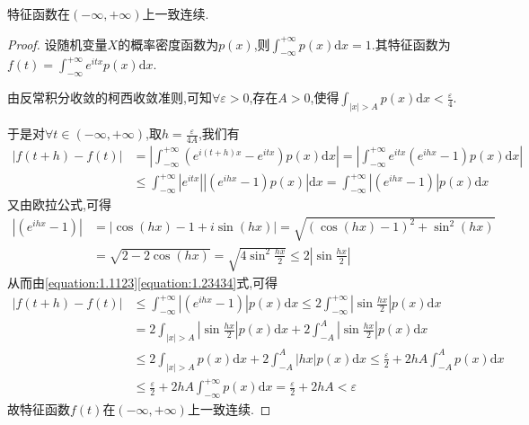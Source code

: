 \documentclass[lang=cn,newtx,10pt,sCheme=Chinese,citestyle=gb7714-2015, bibstyle=gb7714-2015]{../../Template/elegantbook}
\begin{document}
\begin{theorem}[特征函数性质]\label{theorem:特征函数性质}
特征函数在$(-\infty,+\infty)$上一致连续.
\end{theorem}
\begin{proof}

设随机变量\(X\)的概率密度函数为\(p(x)\),则\(\int_{-\infty}^{+\infty}p(x)\mathrm{d}x = 1\).其特征函数为\(f(t) = \int_{-\infty}^{+\infty}e^{itx}p(x)\mathrm{d}x\).

由反常积分收敛的柯西收敛准则,可知\(\forall \varepsilon > 0\),存在\(A > 0\),使得\(\int_{|x| > A}p(x)\mathrm{d}x < \frac{\varepsilon}{4}\).

于是对\(\forall t \in (-\infty, +\infty)\),取\(h = \frac{\varepsilon}{4A}\),我们有
\begin{equation}\label{equation:1.1123}
\begin{aligned}
|f(t + h) - f(t)| &= \left|\int_{-\infty}^{+\infty}(e^{i(t + h)x} - e^{itx})p(x)\mathrm{d}x\right|
= \left|\int_{-\infty}^{+\infty}e^{itx}(e^{ihx} - 1)p(x)\mathrm{d}x\right|\\
&\leqslant \int_{-\infty}^{+\infty}|e^{itx}||(e^{ihx} - 1)p(x)|\mathrm{d}x
= \int_{-\infty}^{+\infty}|(e^{ihx} - 1)|p(x)\mathrm{d}x
\end{aligned}
\end{equation}
又由欧拉公式,可得
\begin{equation}\label{equation:1.23434}
\begin{aligned}
|(e^{ihx} - 1)| &= |\cos(hx) - 1 + i\sin(hx)|
= \sqrt{(\cos(hx) - 1)^2 + \sin^2(hx)}\\
&= \sqrt{2 - 2\cos(hx)}
= \sqrt{4\sin^2\frac{hx}{2}} \leqslant 2\left|\sin\frac{hx}{2}\right|
\end{aligned}
\end{equation}
从而由\eqref{equation:1.1123}\eqref{equation:1.23434}式,可得
\begin{align*}
|f(t + h) - f(t)| &\leqslant \int_{-\infty}^{+\infty}|(e^{ihx} - 1)|p(x)\mathrm{d}x
\leqslant 2\int_{-\infty}^{+\infty}\left|\sin\frac{hx}{2}\right|p(x)\mathrm{d}x\\
&= 2\int_{|x| > A}\left|\sin\frac{hx}{2}\right|p(x)\mathrm{d}x + 2\int_{-A}^{A}\left|\sin\frac{hx}{2}\right|p(x)\mathrm{d}x\\
&\leqslant 2\int_{|x| > A}p(x)\mathrm{d}x + 2\int_{-A}^{A}|hx|p(x)\mathrm{d}x
\leqslant \frac{\varepsilon}{2} + 2hA\int_{-A}^{A}p(x)\mathrm{d}x\\
&\leqslant \frac{\varepsilon}{2} + 2hA\int_{-\infty}^{+\infty}p(x)\mathrm{d}x
= \frac{\varepsilon}{2} + 2hA < \varepsilon
\end{align*}
故特征函数\(f(t)\)在\((-\infty, +\infty)\)上一致连续. 

\end{proof}
\end{document}
